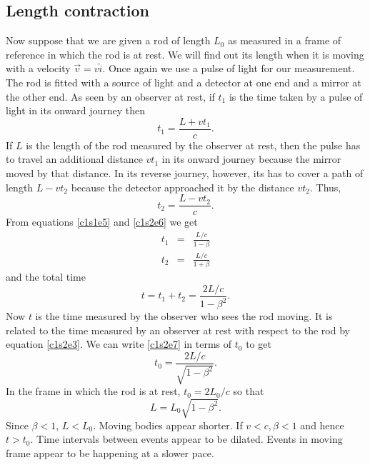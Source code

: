 \subsection{Length contraction}
Now suppose that we are given a rod of length $L_0$ as measured in a frame of
reference in which the rod is at rest. We will find out its length when it is
moving with a velocity $\vec{v} = v\hat{i}$. Once again we use a pulse of light
for our measurement. The rod is fitted with a source of light and a detector
at one end and a mirror at the other end. As seen by an observer at rest,
if $t_1$ is the time taken by a pulse of light in its onward journey then
\begin{equation}\label{c1s2e5}
t_1 = \frac{L + vt_1}{c}.
\end{equation}
If $L$ is the length of the rod measured by the observer at rest, then the pulse
has to travel an additional distance $vt_1$ in its onward journey because the
mirror moved by that distance. In its reverse journey, however, its has to
cover a path of length $L - vt_2$ because the detector approached it by the
distance $vt_2$. Thus,
\begin{equation}\label{c1s2e6}
t_2 = \frac{L - vt_2}{c}.
\end{equation}
From equations \eqref{c1s1e5} and \eqref{c1s2e6} we get
\begin{eqnarray*}
t_1 &=& \frac{L/c}{1 - \beta} \\
t_2 &=& \frac{L/c}{1 + \beta}
\end{eqnarray*}
and the total time 
\begin{equation}\label{c1s2e7}
t = t_1 + t_2 = \frac{2L/c}{1 - \beta^2}.
\end{equation}
Now $t$ is the time measured by the observer who sees the rod moving. It is 
related to the time measured by an observer at rest with respect to the rod by
equation \eqref{c1s2e3}. We can write \eqref{c1s2e7} in terms of $t_0$ to get
\begin{equation}\label{c1s2e8}
t_0 = \frac{2L/c}{\sqrt{1 - \beta^2}}.
\end{equation}
In the frame in which the rod is at rest, $t_0 = 2L_0/c$ so that
\begin{equation}\label{c1s2e9}
L = L_0\sqrt{1 - \beta^2}.
\end{equation}
Since $\beta < 1$, $L < L_0$. Moving bodies appear shorter.
If $v < c, \beta < 1$ and hence $t > t_0$. Time intervals between events appear
to be dilated. Events in moving frame appear to be happening at a slower pace. 

